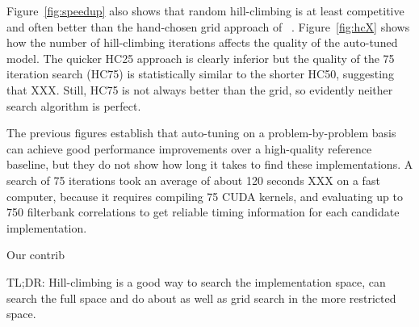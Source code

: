 \documentclass{sig-alternate}
\begin{document}
Figure~\ref{fig:speedup} also shows that random hill-climbing is at least
competitive and often better than the hand-chosen grid approach of ~\citet{pinto+cox:2011gcg}.  Figure~\ref{fig:hcX} shows how the number of hill-climbing iterations
affects the quality of the auto-tuned model.
The quicker HC25 approach is clearly inferior but the quality of the 75 iteration search (HC75) is statistically similar to the shorter HC50, suggesting that XXX.
Still, HC75 is not always better than the grid, so evidently neither search algorithm is perfect.

The previous figures establish that auto-tuning on a problem-by-problem basis can achieve good performance improvements over a high-quality reference baseline, but they do not show how long it takes to find these implementations.  A search of 75 iterations took an average of about 120 seconds XXX on a fast computer, because it requires compiling 75 CUDA kernels, and evaluating up to 750 filterbank correlations to get reliable timing information for each candidate implementation.

Our contrib

TL;DR: Hill-climbing is a good way to search the implementation space, can
search the full space and do about as well as grid search in the more
restricted space.
\end{document}
